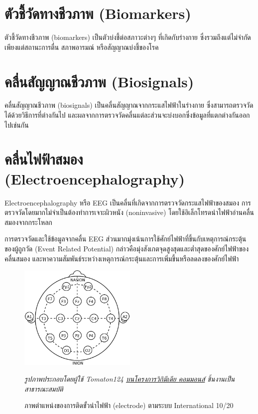 \section{ตัวชี้วัดทางชีวภาพ (Biomarkers)}
ตัวชี้วัดทางชีวภาพ (biomarkers) เป็นตัวบ่งชี้ต่อสภาวะต่างๆ ที่เกิดกับร่างกาย ซึ่งรวมถึงแต่ไม่จำกัดเพียงแต่สถานะการตื่น สภาพอารมณ์ หรือสัญญาณบ่งชี้ของโรค

\section{คลื่นสัญญาณชีวภาพ (Biosignals)}
คลื่นสัญญาณชีวภาพ (biosignals) เป็นคลื่นสัญญาณจากกระแสไฟฟ้าในร่างกาย ซึ่งสามารถตรวจวัดได้ด้วยวิธีการที่ต่างกันไป และผลจากการตรวจวัดคลื่นแต่ละส่วนจะบ่งบอกซึ่งข้อมูลที่แตกต่างกันออกไปเช่นกัน

\section{คลื่นไฟฟ้าสมอง (Electroencephalography)}
Electroencephalography หรือ EEG เป็นคลื่นที่เกิดจากการตรวจวัดกระแสไฟฟ้าของสมอง การตรวจวัดโดยมากไม่จำเป็นต้องทำการเจาะผิวหนัง (noninvasive) โดยใช้อิเล็กโทรดนำไฟฟ้าอ่านคลื่นสมองจากกระโหลก

การตรวจวัดและใช้ข้อมูลจากคลื่น EEG ส่วนมากมุ่งเน้นการใช้ศักย์ไฟฟ้าที่ขึ้นกับเหตุการณ์กระตุ้นของผู้ถูกวัด (Event Related Potential)  กล่าวคือมุ่งสังเกตจุดสูงสุดและต่ำสุดของศักย์ไฟฟ้าของคลื่นสมอง
และหาความสัมพันธ์ระหว่างเหตุการณ์กระตุ้นและการเพิ่มขึ้นหรือลดลงของศักย์ไฟฟ้า

\begin{figure}[h]
	\centering
	\includegraphics[width=0.5\textwidth]{images/1020.png}
	\caption{ภาพตำแหน่งของการติดขั้วนำไฟฟ้า (electrode) ตามระบบ International 10/20}
	\hspace{\linewidth}
	\textit{รูปภาพประกอบโดยผู้ใช้ Tomaton124 \href{https://commons.wikimedia.org/wiki/File:21_electrodes_of_International_10-20_system_for_EEG.svg}{บนโครงการวิกิมีเดีย คอมมอนส์}
		ชิ้นงานเป็นสาธารณะสมบัติ}
\end{figure}

